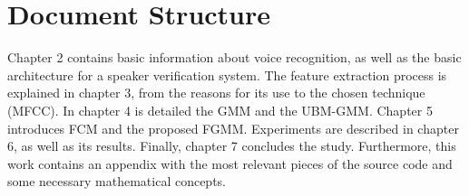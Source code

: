 \section{Document Structure}

Chapter 2 contains basic information about voice recognition, as well as the basic architecture for a speaker verification system. The feature extraction process is explained in chapter 3, from the reasons for its use to the chosen technique (MFCC). In chapter 4 is detailed the GMM and the UBM-GMM. Chapter 5 introduces FCM and the proposed FGMM. Experiments are described in chapter 6, as well as its results. Finally, chapter 7 concludes the study. Furthermore, this work contains an appendix with the most relevant pieces of the source code and some necessary mathematical concepts.